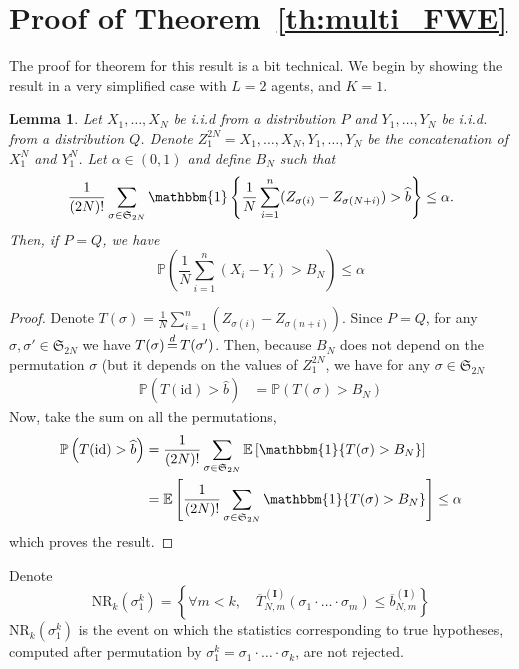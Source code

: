 \documentclass{article}
\theoremstyle{plain}
\newtheorem{Lemma}{Lemma}
\theoremstyle{remark}
\renewcommand{\P}{\mathbb{P}}
\newcommand{\E}{\mathbb{E}}
\renewcommand{\S}{\mathfrak{S}}
\newcommand{\1}{\mathbbm{1}}
\newcommand{\id}{\mathrm{id}}
\newcommand{\dec}{\,{\buildrel d \over =}\,}
\numberwithin{equation}{section}
\begin{document}
\appendix
\section{Proof of Theorem~\ref{th:multi_FWE}}
The proof for theorem for this result is a bit technical. We begin by showing the result in a very simplified case with $L=2$ agents, and $K=1$.
\begin{Lemma}\label{lem:quantile_permu_2}
  Let $X_1,\dots,X_N$ be i.i.d from a distribution $P$ and $Y_1,\dots,Y_N$ be i.i.d. from a distribution $Q$. Denote $Z_1^{2N}=X_1,\dots,X_N,Y_1,\dots,Y_N$ be the concatenation of $X_1^N$ and $Y_1^N$. Let $\alpha \in (0,1)$ and define $B_N$ such that 
  $$ \frac{1}{(2N)!}\sum_{\sigma\in \S_{2N}} \1\left\{ \frac{1}{N}\sum_{i=1}^n (Z_{\sigma(i)}-Z_{\sigma(N+i)}) > \widehat{b}\right\}\le \alpha.$$
  Then, if $P=Q$, we have 
  $$\P\left(\frac{1}{N}\sum_{i=1}^n (X_i-Y_i) > B_N \right)\le \alpha $$ 
\end{Lemma}
\begin{proof}
  Denote $T(\sigma)= \frac{1}{N}\sum_{i=1}^n (Z_{\sigma(i)}-Z_{\sigma(n+i)})$. Since $P=Q$, for any $\sigma,\sigma' \in \S_{2N}$ we have $T(\sigma)\dec T(\sigma')$. Then, because $B_N$ does not depend on the permutation $\sigma$ (but it depends on the values of $Z_1^{2N}$, we have for any $\sigma \in \S_{2N}$
  \begin{align*}
    \P\left(T(\id)> \widehat{b}\right)&=\P\left(T(\sigma)> B_N\right)
  \end{align*} 
  Now, take the sum on all the permutations, 
  \begin{align*}
    \P\left(T(\id)> \widehat{b}\right)&=\frac{1}{(2N)!}\sum_{\sigma\in \S_{2N}} \E\left[\1\{T(\sigma)> B_N\}\right]\\
                                      &=  \E\left[\frac{1}{(2N)!}\sum_{\sigma\in \S_{2N}}\1\{T(\sigma)> B_N\}\right]\le \alpha
  \end{align*}
  which proves the result.
\end{proof}

Denote 
$$\mathrm{NR}_k(\sigma_1^k) = \left\{\forall m < k,\quad  \overline{T}_{N,m}^{(\textbf{I})}(\sigma_1\cdot\ldots\cdot\sigma_m) \le   \overline{b}_{N,m}^{(\textbf{I})}\right\}$$
$\mathrm{NR}_k(\sigma_1^k)$ is the event on which the statistics corresponding to true hypotheses, computed after permutation by $\sigma_1^k=\sigma_1\cdot \ldots \cdot \sigma_k$, are not rejected.
\end{document}
